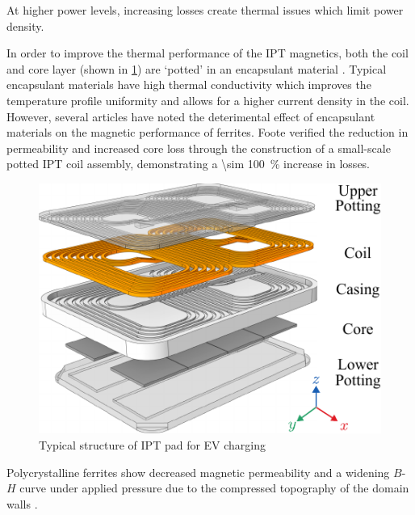 \documentclass[conference]{IEEEtran}
\begin{document}
At higher power levels, increasing losses create thermal issues which limit power density. 

In order to improve the thermal performance of the IPT magnetics, both the coil and core layer (shown in \cref{fig:padstructure}) are `potted' in an encapsulant material \cite{kneidlProcessingInfluencesResinbased2020}. 
Typical encapsulant materials have high thermal conductivity which improves the temperature profile uniformity and allows for a higher current density in the coil. 
However, several articles have noted the deterimental effect of encapsulant materials on the magnetic performance of ferrites. 
Foote \cite{footeEncapsulationResidualStress2023} verified the reduction in permeability and increased core loss through the construction of a small-scale potted IPT coil assembly, demonstrating a \SI{\sim 100}{\percent} increase in losses.

\begin{figure}[t]
  \centering
  \includegraphics{figures/padstructure.pdf}
  \caption{Typical structure of IPT pad for EV charging}
  \label{fig:padstructure}
\end{figure}

Polycrystalline ferrites show decreased magnetic permeability and a widening $B$-$H$ curve under applied pressure due to the compressed topography of the domain walls \cite{leflochEffectPressureSoft1981}. 
\end{document}
